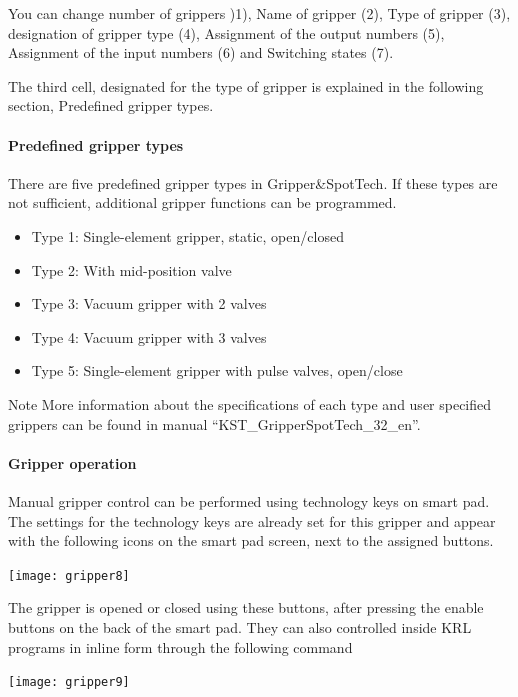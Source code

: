 You can change number of grippers )1), Name of gripper (2), Type of gripper (3), designation of gripper type (4), Assignment of the output numbers (5), Assignment of the input numbers (6) and Switching states (7). 

The third cell, designated for the type of gripper is explained in the following section, Predefined gripper types.
   

\paragraph{Predefined gripper types}
There are five predefined gripper types in Gripper\&SpotTech. If these types are not sufficient, additional gripper functions can be programmed.
	\begin{itemize}
		\item Type 1: Single-element gripper, static, open/closed
		\item Type 2: With mid-position valve
		\item Type 3: Vacuum gripper with 2 valves
		\item Type 4: Vacuum gripper with 3 valves
		\item Type 5: Single-element gripper with pulse valves, open/close
	\end{itemize}
	  \begin{mynotebox}{Note}
			More information about the specifications of each type and user specified grippers can be found in manual “KST\_GripperSpotTech\_32\_en”.
    \end{mynotebox}

	\paragraph{Gripper operation}
	Manual gripper control can be performed using technology keys on smart pad. The settings for the technology keys are already set for this gripper and appear with the following icons on the smart pad screen, next to the assigned buttons. 

\begin{center}
	\texttt{[image: gripper8]} 
\end{center}

The gripper is opened or closed using these buttons, after pressing the enable buttons on the back of the smart pad. They can also controlled inside KRL programs in inline form through the following command
\begin{center}
\texttt{[image: gripper9]}
\end{center}

